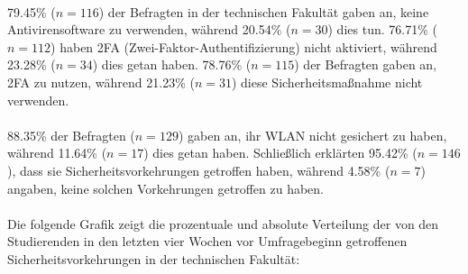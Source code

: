 \documentclass[german,report]{i1thesis}
\begin{document}
\\
79.45\% (\(n = 116\)) der Befragten in der technischen Fakultät gaben an, keine Antivirensoftware zu verwenden, während 20.54\% (\(n = 30\)) dies tun. 76.71\% (\(n = 112\)) haben 2FA (Zwei-Faktor-Authentifizierung) nicht aktiviert, während 23.28\% (\(n = 34\)) dies getan haben. 78.76\% (\(n = 115\)) der Befragten gaben an, 2FA zu nutzen, während 21.23\% (\(n = 31\)) diese Sicherheitsmaßnahme nicht verwenden.\\
\\
88.35\% der Befragten (\(n = 129\)) gaben an, ihr WLAN nicht gesichert zu haben, während 11.64\% (\(n = 17\)) dies getan haben. Schließlich erklärten 95.42\% (\(n = 146\)), dass sie Sicherheitsvorkehrungen getroffen haben, während 4.58\% (\(n = 7\)) angaben, keine solchen Vorkehrungen getroffen zu haben.\\
\\
Die folgende Grafik zeigt die prozentuale und absolute Verteilung der von den Studierenden in den letzten vier Wochen vor Umfragebeginn getroffenen Sicherheitsvorkehrungen in der technischen Fakultät:
\end{document}
